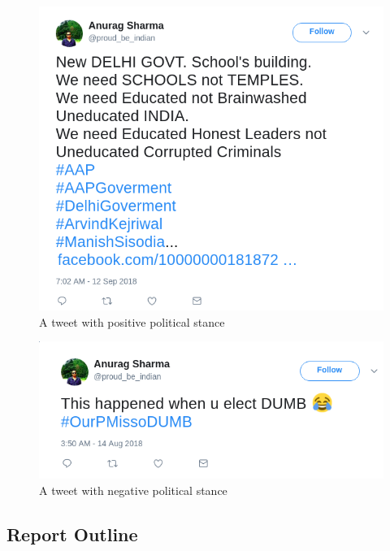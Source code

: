\documentclass[a4paper,11pt]{article}
\begin{document}
\begin{figure}
    \includegraphics[width=\linewidth]{pro.png}
    \caption{A tweet with positive political stance}
    \label{fig:example3}
\end{figure}

\begin{figure}
    \includegraphics[width=\linewidth]{anti.png}
    \caption{A tweet with negative political stance}
    \label{fig:example4}
\end{figure}

\newpage
\subsection{Report Outline}
\end{document}
